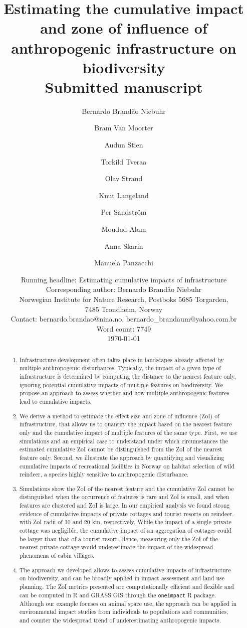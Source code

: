 \documentclass[titlepage]{article}
\title{
Estimating the cumulative impact and zone of influence of anthropogenic infrastructure on biodiversity  \\
{\normalsize Submitted manuscript}
}
\author[1,2,*]{Bernardo Brandão Niebuhr}
\author[1,*]{Bram Van Moorter}
\author[3]{Audun Stien}
\author[4]{Torkild Tveraa}
\author[1]{Olav Strand}
\author[4]{Knut Langeland}
\author[5]{Per Sandström}
\author[6]{Moudud Alam}
\author[2]{Anna Skarin}
\author[1]{Manuela Panzacchi}
\affil[1]{Norwegian Institute for Nature Research (NINA), Trondheim, Norway}
\affil[2]{Swedish University of Agricultural Sciences (SLU), Uppsala, Sweden}
\affil[3]{University of Tromsø, Tromsø, Norway}
\affil[4]{Norwegian Institute for Nature Research (NINA), Tromsø, Norway}
\affil[5]{Swedish University of Agricultural Sciences (SLU), Umeå, Sweden}
\affil[6]{Dalarna University, Falun, Sweden}
\affil[*]{Joint first authorship}
\date{Running headline: Estimating cumulative impacts of infrastructure \\
Corresponding author: Bernardo Brandão Niebuhr \\Norwegian Institute for Nature Research, Postboks 5685 Torgarden, \\7485 Trondheim, Norway \\Contact: bernardo.brandao@nina.no, bernardo\_brandaum@yahoo.com.br \\ Word count: 7749 \\ \today}
\begin{document}
\maketitle

\begin{abstract}

\begin{enumerate}

    \item Infrastructure development often takes place in landscapes already affected by multiple anthropogenic disturbances. Typically, the impact of a given type of infrastructure is determined by computing the distance to the nearest feature only, ignoring potential cumulative impacts of multiple features on biodiversity. We propose an approach to assess whether and how multiple anthropogenic features lead to cumulative impacts.

    \item We derive a method to estimate the effect size and zone of influence (ZoI) of infrastructure, that allows us to quantify the impact based on the nearest feature only and the cumulative impact of multiple features of the same type. First, we use simulations and an empirical case to understand under which circumstances the estimated cumulative ZoI cannot be distinguished from the ZoI of the nearest feature only. Second, we illustrate the approach by quantifying and visualizing cumulative impacts of recreational facilities in Norway on habitat selection of wild reindeer, a species highly sensitive to anthropogenic disturbance. 

    \item Simulations show the ZoI of the nearest feature and the cumulative ZoI cannot be distinguished when the occurrence of features is rare and ZoI is small, and when features are clustered and ZoI is large. In our empirical analysis we found strong evidence of cumulative impacts of private cottages and tourist resorts on reindeer, with ZoI radii of 10 and 20 km, respectively. While the impact of a single private cottage was negligible, the cumulative impact of an aggregation of cottages could be larger than that of a tourist resort. Hence, measuring only the ZoI of the nearest private cottage would underestimate the impact of the widespread phenomena of cabin villages.

    \item The approach we developed allows to assess cumulative impacts of infrastructure on biodiversity, and can be broadly applied in impact assessment and land use planning. The ZoI metrics presented are computationally efficient and flexible and can be computed in R and GRASS GIS through the \verb|oneimpact| R package. Although our example focuses on animal space use, the approach can be applied
    in environmental impact studies from individuals to populations and communities, and counter the widespread trend of underestimating anthropogenic impacts.
\end{enumerate}


\end{abstract}
\end{document}
